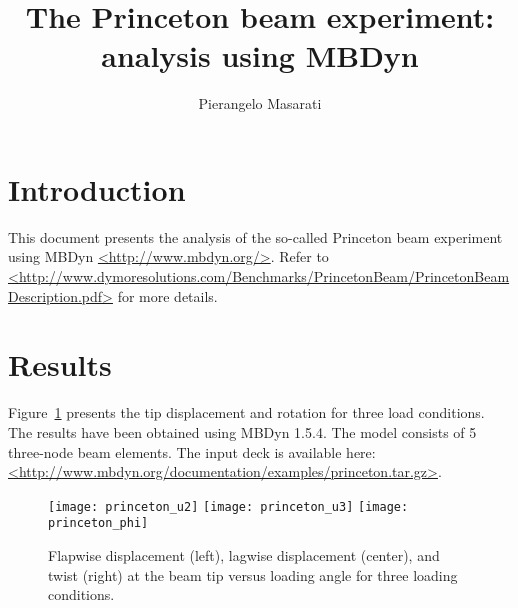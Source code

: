 \documentclass{article}
\begin{document}
\title{The Princeton beam experiment: \\ analysis using MBDyn}
\author{Pierangelo Masarati}
\date{}
\maketitle

\section{Introduction}
This document presents the analysis of the so-called
Princeton beam experiment \cite{DOWELL-1975-PRINCETON-1194,DOWELL-1975-PRINCETON-1257}
using MBDyn \url{<http://www.mbdyn.org/>}.
Refer to \url{<http://www.dymoresolutions.com/Benchmarks/PrincetonBeam/PrincetonBeamDescription.pdf>}
for more details.

\section{Results}
Figure~\ref{fig:tip} presents the tip displacement and rotation
for three load conditions.
The results have been obtained using MBDyn 1.5.4.
The model consists of 5 three-node beam elements.
The input deck is available here: \url{<http://www.mbdyn.org/documentation/examples/princeton.tar.gz>}.

\begin{figure}
\centering
\texttt{[image: princeton\_u2]}\hfill%
\texttt{[image: princeton\_u3]}\hfill%
\texttt{[image: princeton\_phi]}
\caption{Flapwise displacement (left),
lagwise displacement (center),
and twist (right)
at the beam tip versus loading angle
for three loading conditions.}
\label{fig:tip}
\end{figure}




\end{document}
